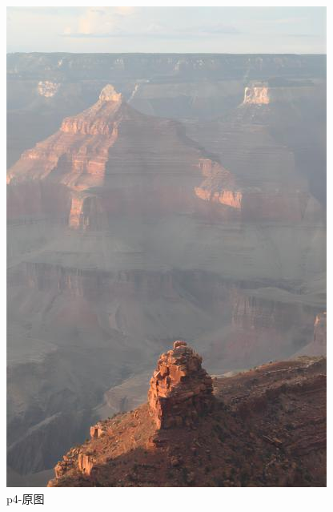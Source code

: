 \documentclass[12pt]{article}
\begin{document}
 \begin{figure}[!h]
    \centering
    \begin{minipage}[t]{0.24\linewidth}
        \centering
        \includegraphics[width=0.9\linewidth]{sample_pictures/p4.jpg}
        \caption*{p4-原图}
    \end{minipage}
    \begin{minipage}[t]{0.24\linewidth}
        \centering

\end{minipage}
\end{figure}
\end{document}

